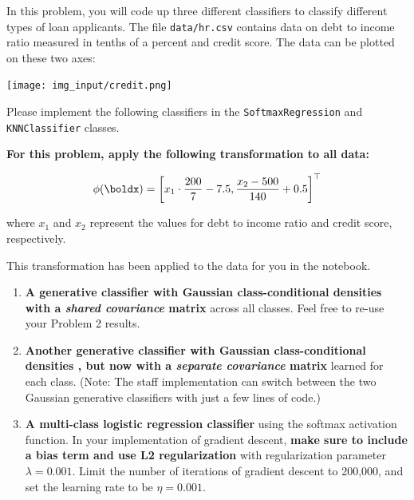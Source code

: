 \documentclass[submit]{../harvardml}
\begin{document}
\begin{problem}
In this problem, you will code up three different classifiers to classify different types of loan applicants. The file \verb|data/hr.csv| contains data on debt to income ratio measured in tenths of a percent and credit score. The data can be plotted on these two axes:
\begin{center}
  \texttt{[image: img\_input/credit.png]}
\end{center}

Please implement the following classifiers in the \verb|SoftmaxRegression| and \verb|KNNClassifier| classes.

\textbf{For this problem, apply the following transformation to all data:}

$$\phi(\boldx) = \left[x_1 \cdot \frac{200}{7}-7.5, \frac{x_2-500}{140}+0.5\right]^\top$$

  where $x_1$ and $x_2$ represent the values for debt to income ratio and credit score, respectively.
  
  This transformation has been applied to the data for you in the notebook.

\begin{enumerate}[label=\alph*)]

  \item \textbf{A generative classifier with Gaussian class-conditional
          densities with a \textit{shared covariance} matrix} across all classes.
        Feel free to re-use your Problem 2 results.

  \item \textbf{Another generative classifier with Gaussian class-conditional densities , but now
          with a \textit{separate covariance} matrix} learned for each class. (Note:
        The staff implementation can switch between the two Gaussian generative classifiers with just a
        few lines of code.)

  \item \textbf{A multi-class logistic regression classifier} using the softmax activation function. In your implementation of gradient descent, \textbf{make sure to include a bias term and use L2 regularization} with regularization parameter $\lambda = 0.001$. Limit the number of iterations of gradient descent to 200,000, and set the learning rate to be $\eta = 0.001$.


\end{enumerate}
\end{problem}
\end{document}

